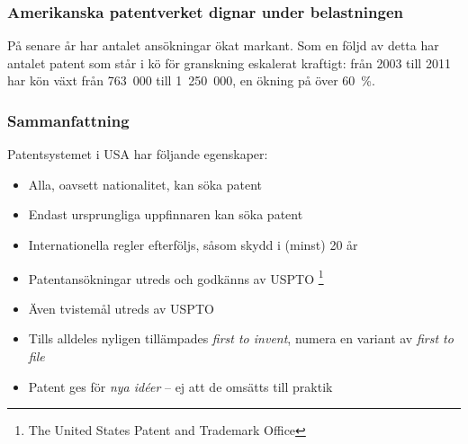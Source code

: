 \subsubsection{Amerikanska patentverket dignar under belastningen}

På senare år har antalet ansökningar ökat markant. Som en följd av detta har antalet patent som står i kö för granskning eskalerat kraftigt: från 2003 till 2011 har kön växt från 763~000 till 1~250~000, en ökning på över 60~\%.


\subsubsection{Sammanfattning}

Patentsystemet i USA har följande egenskaper:

\begin{itemize}
    \item{Alla, oavsett nationalitet, kan söka patent}
    \item{Endast ursprungliga uppfinnaren kan söka patent}
    \item{Internationella regler efterföljs, såsom skydd i (minst) 20 år}
    \item{Patentansökningar utreds och godkänns av USPTO \footnote{The United States Patent and Trademark Office}}
    \item{Även tvistemål utreds av USPTO}
    \item{Tills alldeles nyligen tillämpades \emph{first to invent}, numera en variant av \emph{first to file}}
    \item{Patent ges för \emph{nya idéer} -- ej att de omsätts till praktik}
\end{itemize}
